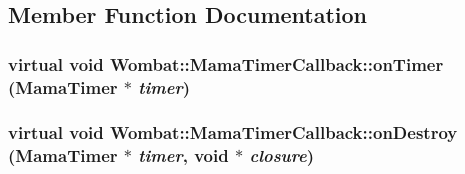 \subsection{Member Function Documentation}
\hypertarget{classWombat_1_1MamaTimerCallback_af0ba2499053f2302fab309a1fdb30920}{
\subsubsection[{onTimer}]{\setlength{\rightskip}{0pt plus 5cm}virtual void Wombat::MamaTimerCallback::onTimer ({\bf MamaTimer} $\ast$ {\em timer})}}
\label{classWombat_1_1MamaTimerCallback_af0ba2499053f2302fab309a1fdb30920}
\hypertarget{classWombat_1_1MamaTimerCallback_a7e2e85ffd45910d1bf377cefd7ea6b0f}{
\subsubsection[{onDestroy}]{\setlength{\rightskip}{0pt plus 5cm}virtual void Wombat::MamaTimerCallback::onDestroy ({\bf MamaTimer} $\ast$ {\em timer}, \/  void $\ast$ {\em closure})}}
\label{classWombat_1_1MamaTimerCallback_a7e2e85ffd45910d1bf377cefd7ea6b0f}
